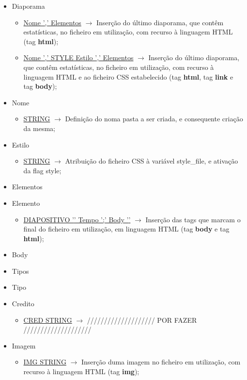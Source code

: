 \documentclass[11pt,a4paper]{report}
\begin{document}
\begin{itemize}
	\item Diaporama
	\begin{itemize}
		\item \underline{Nome ',' Elementos}  $\rightarrow$ Inserção do último diaporama, que contêm estatísticas, no ficheiro em utilização, com recurso à linguagem HTML (tag \textbf{html});
		\item \underline{Nome ',' STYLE Estilo ',' Elementos}  $\rightarrow$ Inserção do último diaporama, que contêm estatísticas, no ficheiro em utilização, com recurso à linguagem HTML e ao ficheiro CSS estabelecido (tag \textbf{html}, tag \textbf{link} e tag \textbf{body});
	\end{itemize}
	\item Nome
	\begin{itemize}
		\item \underline{STRING}  $\rightarrow$ Definição do noma pasta a ser criada, e consequente criação da mesma;
	\end{itemize}
	\item Estilo
	\begin{itemize}
		\item \underline{STRING}  $\rightarrow$ Atribuição do ficheiro CSS à variável style\_file, e ativação da flag style;
	\end{itemize}
	\item Elementos
	\item Elemento
	\begin{itemize}
		\item \underline{DIAPOSITIVO '{' Tempo ';' Body '}'}  $\rightarrow$ Inserção das tags que marcam o final do ficheiro em utilização, em linguagem HTML (tag \textbf{body} e tag \textbf{html});
	\end{itemize}
	\item Body
	\item Tipos
	\item Tipo
	\item Credito
	\begin{itemize}
		\item \underline{CRED STRING}  $\rightarrow$  //////////////////// POR FAZER ////////////////////
	\end{itemize}
	\item Imagem
	\begin{itemize}
		\item \underline{IMG STRING}  $\rightarrow$ Inserção duma imagem no ficheiro em utilização, com recurso à linguagem HTML (tag \textbf{img});

\end{itemize}
\end{itemize}
\end{document}
